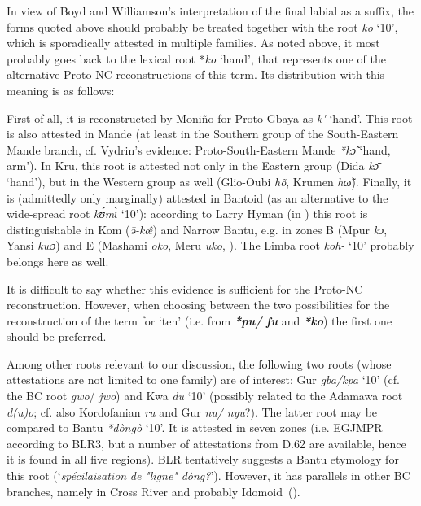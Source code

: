 In view of Boyd and Williamson’s interpretation of the final labial as a suffix, the forms quoted above should probably be treated together with the root \textit{ko} ‘10’, which is sporadically attested in multiple families. As noted above, it most probably goes back to the lexical root *\textit{ko} ‘hand’, that represents one of the alternative Proto-NC reconstructions of this term. Its distribution with this meaning is as follows:

First of all, it is reconstructed by Moniño for Proto-Gbaya as \textit{k{\'{}}} ‘hand’. This root is also attested in Mande (at least in the Southern group of the South-Eastern Mande branch, cf. Vydrin’s evidence: Proto-South-Eastern Mande  \textit{*k{\~{ɔ}}} ‘hand, arm’). In Kru, this root is attested not only in the Eastern group (Dida \textit{k{\={ɔ}}} ‘hand’), but in the Western group as well (Glio-Oubi \textit{h{\~{o}}}, Krumen \textit{h{\~{ɷ}}{\textprimstress}}). Finally, it is (admittedly only marginally) attested in Bantoid (as an alternative to the wide-spread root \textit{k{\'{ʊ}}m{\`{ɩ}}} ‘10’): according to Larry Hyman (in \citealt{Paulin1995}) this root is distinguishable in Kom (\textit{{\={ə}}-k{\^{œ}}}) and Narrow Bantu, e.g. in zones B (Mpur \textit{kɔ}, Yansi \textit{kwɔ}) and E (Mashami \textit{oko}, Meru \textit{uko}, \citealt{NursePhilippson1975}). The Limba root \textit{koh-} ‘10’ probably belongs here as well. 

It is difficult to say whether this evidence is sufficient for the Proto-NC reconstruction. However, when choosing between the two possibilities for the reconstruction of the term for ‘ten’ (i.e. from \textbf{\textit{*pu/} \textit{fu}} and \textbf{\textit{*ko}}) the first one should be preferred.

Among other roots relevant to our discussion, the following two roots (whose attestations are not limited to one family) are of interest: Gur \textit{gba/kpa} ‘10’ (cf. the BC root \textit{gwo}/ \textit{jwo}) and Kwa \textit{du} ‘10’ (possibly related to the Adamawa root \textit{d(u)o}; cf. also Kordofanian \textit{ru} and Gur \textit{nu/} \textit{nyu}?). The latter root may be compared to Bantu \textit{*dòngò} ‘10’. It is attested in seven zones (i.e. EGJMPR according to BLR3, but a number of attestations from D.62 are available, hence it is found in all five regions). BLR tentatively suggests a Bantu etymology for this root (‘\textit{spécilaisation} \textit{de} \textit{"ligne"} \textit{dòng?}’). However, it has parallels in other BC branches, namely in Cross River \citep{Connell1991} and probably Idomoid~().


